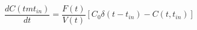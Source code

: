 \begin{equation}
\frac{dC(tmt_{in})}{dt} = \frac{F(t)}{V(t)}[C_0\delta(t-t_{in})-C(t,t_{in})]
\end{equation}